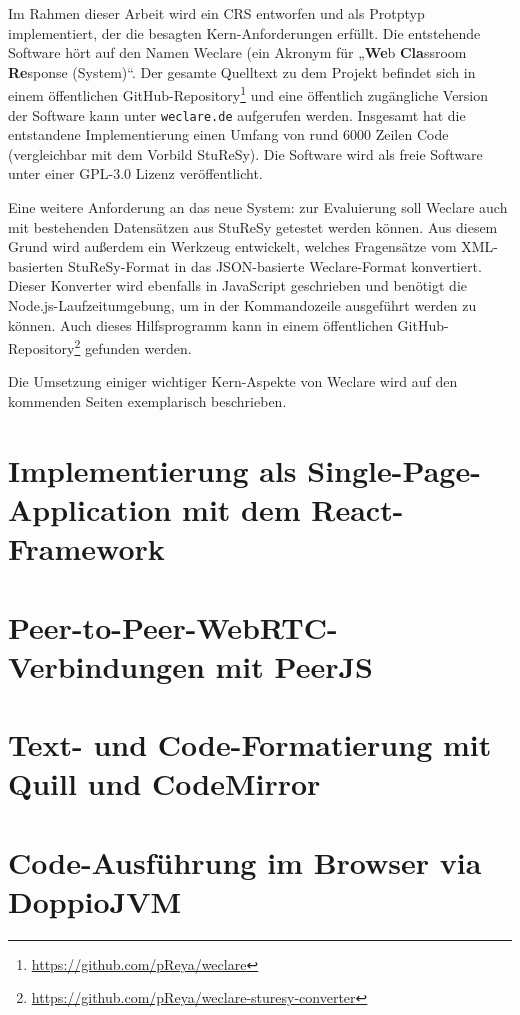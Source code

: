 Im Rahmen dieser Arbeit wird ein CRS entworfen und als Protptyp implementiert, der die besagten Kern-Anforderungen erfüllt. Die entstehende Software hört auf den Namen Weclare (ein Akronym für „\textbf{We}b \textbf{Cla}ssroom \textbf{Re}sponse (System)“. Der gesamte Quelltext zu dem Projekt befindet sich in einem öffentlichen GitHub-Repository\footnote{\url{https://github.com/pReya/weclare}} und eine öffentlich zugängliche Version der Software kann unter \texttt{weclare.de} aufgerufen werden. Insgesamt hat die entstandene Implementierung einen Umfang von rund 6000 Zeilen Code (vergleichbar mit dem Vorbild StuReSy). Die Software wird als freie Software unter einer GPL-3.0 Lizenz veröffentlicht.

Eine weitere Anforderung an das neue System: zur Evaluierung soll Weclare auch mit bestehenden Datensätzen aus StuReSy getestet werden können. Aus diesem Grund wird außerdem ein Werkzeug entwickelt, welches Fragensätze vom XML-basierten StuReSy-Format in das JSON-basierte Weclare-Format konvertiert. Dieser Konverter wird ebenfalls in JavaScript geschrieben und benötigt die Node.js-Laufzeitumgebung, um in der Kommandozeile ausgeführt werden zu können. Auch dieses Hilfsprogramm kann in einem öffentlichen GitHub-Repository\footnote{\url{https://github.com/pReya/weclare-sturesy-converter}} gefunden werden. 

Die Umsetzung einiger wichtiger Kern-Aspekte von Weclare wird auf den kommenden Seiten exemplarisch beschrieben.

\newpage
\section{Implementierung als Single-Page-Application mit dem React-Framework}
\label{chap:react_einfuehrung}


\newpage
\section{Peer-to-Peer-WebRTC-Verbindungen mit PeerJS}
\label{chap:p2p}


\newpage
\section{Text- und Code-Formatierung mit Quill und CodeMirror}
\label{chap:formatierung}


\newpage
\section{Code-Ausführung im Browser via DoppioJVM}
\label{chap:ausfuehrung}
